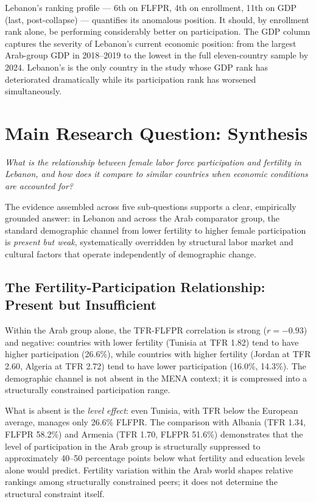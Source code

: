 \documentclass[12pt,a4paper]{article}
\begin{document}
Lebanon's ranking profile --- 6th on FLFPR, 4th on enrollment, 11th on GDP (last, post-collapse) --- quantifies its anomalous position. It should, by enrollment rank alone, be performing considerably better on participation. The GDP column captures the severity of Lebanon's current economic position: from the largest Arab-group GDP in 2018--2019 to the lowest in the full eleven-country sample by 2024. Lebanon's is the only country in the study whose GDP rank has deteriorated dramatically while its participation rank has worsened simultaneously.

\section{Main Research Question: Synthesis}
\label{sec:synthesis}

\textit{What is the relationship between female labor force participation and fertility in Lebanon, and how does it compare to similar countries when economic conditions are accounted for?}

The evidence assembled across five sub-questions supports a clear, empirically grounded answer: in Lebanon and across the Arab comparator group, the standard demographic channel from lower fertility to higher female participation is \textit{present but weak}, systematically overridden by structural labor market and cultural factors that operate independently of demographic change.

\subsection{The Fertility-Participation Relationship: Present but Insufficient}

Within the Arab group alone, the TFR-FLFPR correlation is strong ($r = -0.93$) and negative: countries with lower fertility (Tunisia at TFR 1.82) tend to have higher participation (26.6\%), while countries with higher fertility (Jordan at TFR 2.60, Algeria at TFR 2.72) tend to have lower participation (16.0\%, 14.3\%). The demographic channel is not absent in the MENA context; it is compressed into a structurally constrained participation range.

What is absent is the \textit{level effect}: even Tunisia, with TFR below the European average, manages only 26.6\% FLFPR. The comparison with Albania (TFR 1.34, FLFPR 58.2\%) and Armenia (TFR 1.70, FLFPR 51.6\%) demonstrates that the level of participation in the Arab group is structurally suppressed to approximately 40--50 percentage points below what fertility and education levels alone would predict. Fertility variation within the Arab world shapes relative rankings among structurally constrained peers; it does not determine the structural constraint itself.
\end{document}
